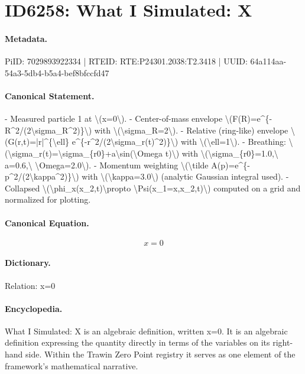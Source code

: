 \section*{ID6258: What I Simulated: X}
\paragraph{Metadata.}
PiID: 7029893922334 | RTEID: RTE:P24301.2038:T2.3418 | UUID: 64a114aa-54a3-5db4-b5a4-bef8bfccfd47

\paragraph{Canonical Statement.}
- Measured particle 1 at \textbackslash{}(x=0\textbackslash{}). - Center-of-mass envelope \textbackslash{}(F(R)=e\textasciicircum{}\{-R\textasciicircum{}2/(2\textbackslash{}sigma\_R\textasciicircum{}2)\}\textbackslash{}) with \textbackslash{}(\textbackslash{}sigma\_R=2\textbackslash{}). - Relative (ring-like) envelope \textbackslash{}(G(r,t)=|r|\textasciicircum{}\{\textbackslash{}ell\} e\textasciicircum{}\{-r\textasciicircum{}2/(2\textbackslash{}sigma\_r(t)\textasciicircum{}2)\}\textbackslash{}) with \textbackslash{}(\textbackslash{}ell=1\textbackslash{}). - Breathing: \textbackslash{}(\textbackslash{}sigma\_r(t)=\textbackslash{}sigma\_\{r0\}+a\textbackslash{}sin(\textbackslash{}Omega t)\textbackslash{}) with \textbackslash{}(\textbackslash{}sigma\_\{r0\}=1.0,\textbackslash{} a=0.6,\textbackslash{} \textbackslash{}Omega=2.0\textbackslash{}). - Momentum weighting \textbackslash{}(\textbackslash{}tilde A(p)=e\textasciicircum{}\{-p\textasciicircum{}2/(2\textbackslash{}kappa\textasciicircum{}2)\}\textbackslash{}) with \textbackslash{}(\textbackslash{}kappa=3.0\textbackslash{}) (analytic Gaussian integral used). - Collapsed \textbackslash{}(\textbackslash{}phi\_x(x\_2,t)\textbackslash{}propto \textbackslash{}Psi(x\_1=x,x\_2,t)\textbackslash{}) computed on a grid and normalized for plotting.

\paragraph{Canonical Equation.}
\[
x=0
\]

\paragraph{Dictionary.}
Relation: x=0

\paragraph{Encyclopedia.}
What I Simulated: X is an algebraic definition, written x=0. It is an algebraic definition expressing the quantity directly in terms of the variables on its right-hand side. Within the Trawin Zero Point registry it serves as one element of the framework's mathematical narrative.
